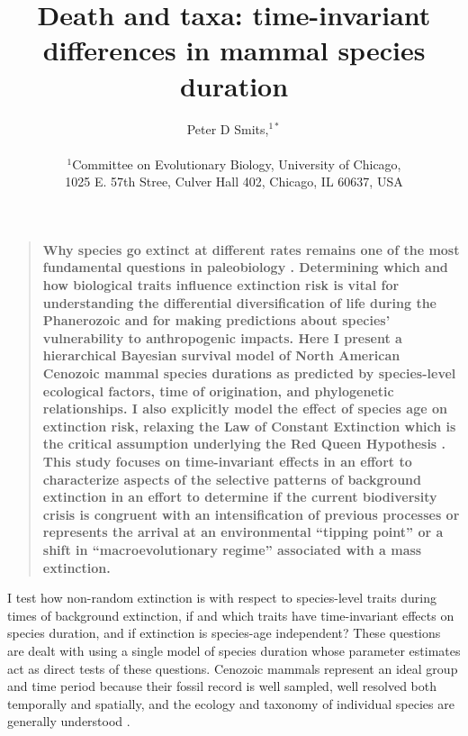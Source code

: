 \documentclass[12pt]{article}
\title{Death and taxa: time-invariant differences in mammal species duration}
\author
{Peter D Smits,$^{1\ast}$\\
\\
\normalsize{$^{1}$Committee on Evolutionary Biology, University of Chicago,}\\
\normalsize{1025 E. 57th Stree, Culver Hall 402, Chicago, IL 60637, USA}\\
}
\date{}
\newenvironment{sciabstract}{%
\begin{quote} \bf}
{\end{quote}}
\begin{document}
 


\baselineskip24pt


\maketitle 


\begin{sciabstract}
  Why species go extinct at different rates remains one of the most fundamental questions in paleobiology \cite{Simpson1944,VanValen1973,Raup1994,Quental2013,Wagner2014b}. Determining which and how biological traits influence extinction risk is vital for understanding the differential diversification of life during the Phanerozoic and for making predictions about species' vulnerability to anthropogenic impacts. Here I present a hierarchical Bayesian survival model of North American Cenozoic mammal species durations as predicted by species-level ecological factors, time of origination, and phylogenetic relationships. I also explicitly model the effect of species age on extinction risk, relaxing the Law of Constant Extinction which is the critical assumption underlying the Red Queen Hypothesis \cite{VanValen1973}. 
  This study focuses on time-invariant effects in an effort to characterize aspects of the selective patterns of background extinction in an effort to determine if the current biodiversity crisis is congruent with an intensification of previous processes or represents the arrival at an environmental ``tipping point'' \cite{Barnosky2011,Barnosky2012a} or a shift in ``macroevolutionary regime'' \cite{Jablonski1986} associated with a mass extinction.
\end{sciabstract}

I test how non-random extinction is with respect to species-level traits during times of background extinction, if and which traits have time-invariant effects on species duration, and if extinction is species-age independent? These questions are dealt with using a single model of species duration whose parameter estimates act as direct tests of these questions. Cenozoic mammals represent an ideal group and time period because their fossil record is well sampled, well resolved both temporally and spatially, and the ecology and taxonomy of individual species are generally understood \cite{Alroy2009,Liow2008,Smith2004,Quental2013,Simpson1944,Tomiya2013,Marcot2014}. 
\end{document}
